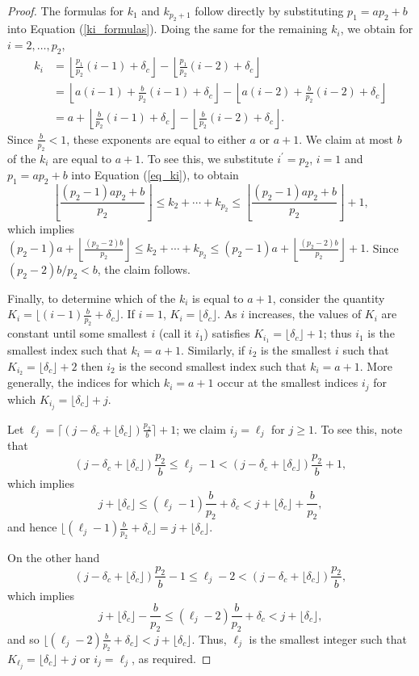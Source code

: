 \documentclass[pdflatex,sn-mathphys-num]{sn-jnl}
\theoremstyle{thmstyleone}%
\theoremstyle{thmstyletwo}%
\theoremstyle{thmstylethree}%
\begin{document}
 
\begin{proof} 
The formulas for $k_1$ and $k_{p_2+1}$ follow directly by substituting $p_1=ap_2+b$  into  Equation (\ref{ki_formulas}).   
 Doing the same for the remaining $k_i$, we obtain for $i=2, \ldots, p_2$,
  \begin{align*}k_i & =\left\lfloor \frac{p_1}{p_2}(i-1)+ \delta_c \right\rfloor - \left\lfloor  \frac{p_1}{p_2}(i-2) +\delta_c \right\rfloor \\
& = \left\lfloor a(i-1)+ \frac{b}{p_2}(i-1)+  \delta_c \right\rfloor - \left\lfloor a(i-2) +\frac{b}{p_2}(i-2) +  \delta_c\right\rfloor \\
& = a +  \left\lfloor  \frac{b}{p_2}(i-1)+   \delta_c \right\rfloor - \left\lfloor \frac{b}{p_2}(i-2) +\delta_c \right\rfloor.
\end{align*}
Since $\frac{b}{p_2}<1$, these exponents   are equal to either $a$ or $a+1$.  We claim  at most $b$ of the $k_i$  are equal to $a+1$. To see this, we substitute $i^\prime=p_2$, $i=1$ and $p_1=ap_2+b$ into Equation (\ref{eq_ki}), to obtain
$$\left\lfloor \frac{(p_2-1)ap_2+b}{p_2}\right\rfloor \le k_{2}+ \cdots + k_{p_2} \le  \left\lfloor \frac{(p_2-1)ap_2+b}{p_2}\right\rfloor + 1,$$ 
which implies $(p_2-1)a+ \left\lfloor\frac{(p_2-2)b}{p_2}\right\rfloor \le  k_{2}+ \cdots + k_{p_2} \le  (p_2-1)a+ \left\lfloor\frac{(p_2-2)b}{p_2}\right\rfloor+1.$ Since $(p_2-2)b/p_2<b$, the claim follows.

 Finally, to determine which of the $k_i$ is equal to $a+1$, consider the quantity  $K_{i} =\lfloor (i-1) \frac{b}{p_2} +\delta_c\rfloor$. If $i=1$, $K_i= \lfloor \delta_c \rfloor$. As $i$ increases, the values of $K_i$ are constant until some smallest $i$  (call it $i_1$) satisfies $K_{i_1} = \lfloor \delta_c \rfloor+1$; thus $i_1$ is the smallest  index such that $k_{i}=a+1.$ Similarly, if $i_2$ is the smallest $i$ such that $K_{i_2} = \lfloor \delta_c \rfloor+2$ then $i_2$ is the second smallest index  such that $k_{i}=a+1.$ More generally, the indices for which $k_i=a+1$ occur at the smallest indices $i_j$ for which  $K_{i_j} = \lfloor \delta_c \rfloor+j.$   

Let $\ell_j= \lceil (j-\delta_c+ \lfloor \delta_c \rfloor)\frac{p_2}{b} \rceil + 1$; we claim $i_j=\ell_j$  for $j \ge 1$. To see this, note that  
$$(j-\delta_c+ \lfloor \delta_c \rfloor )\frac{p_2}{b} \le   \ell_j-1< (j-\delta_c+ \lfloor \delta_c \rfloor )\frac{p_2}{b}+1,$$ 
which implies
$$j+ \lfloor \delta_c \rfloor \le   (\ell_j-1)\frac{b}{p_2} +\delta_c < j+ \lfloor \delta_c \rfloor +\frac{b}{p_2},$$ 
and hence $ \lfloor  (\ell_j-1)\frac{b}{p_2} +\delta_c  \rfloor = j+ \lfloor \delta_c \rfloor.$

On the other hand
$$(j-\delta_c+ \lfloor \delta_c \rfloor )\frac{p_2}{b}-1 \le   \ell_j-2 <(j-\delta_c+ \lfloor \delta_c \rfloor )\frac{p_2}{b},$$ 
which implies
$$j+ \lfloor \delta_c \rfloor -\frac{b}{p_2} \le   (\ell_j-2)\frac{b}{p_2} +\delta_c  < j+ \lfloor \delta_c \rfloor,$$ 
and so $ \lfloor  (\ell_j-2)\frac{b}{p_2} +\delta_c  \rfloor < j+ \lfloor \delta_c \rfloor.$
Thus, $\ell_j$ is the smallest integer such that  $K_{\ell_j} =\lfloor \delta_c \rfloor+j$ or $i_j=\ell_j$, as required. 
\end{proof}
\end{document}
